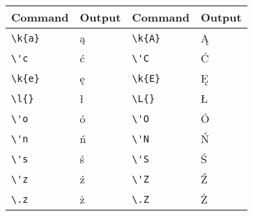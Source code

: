 \documentclass[a4paper,12pt]{article}
\begin{document}
\begin{tabular}{|l l|l l|}
\hline
Command & Output & Command & Output \\
\hline
\verb=\k{a}=&ą&\verb=\k{A}=&Ą\\
\verb=\'c=&ć&\verb=\'C=&Ć\\
\verb=\k{e}=&ę&\verb=\k{E}=&Ę\\
\verb=\l{}=&ł&\verb=\L{}=&Ł\\
\verb=\'o=&ó&\verb=\'O=&Ó\\
\verb=\'n=&ń&\verb=\'N=&Ń\\
\verb=\'s=&ś&\verb=\'S=&Ś\\
\verb=\'z=&ź&\verb=\'Z=&Ź\\
\verb=\.z=&ż&\verb=\.Z=&Ż\\
\hline
\end{tabular}
\end{document}

